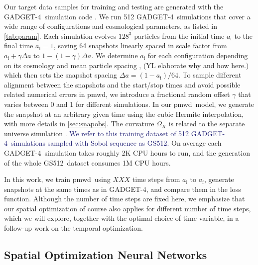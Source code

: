 \documentclass[modern, trackchanges, dvipsnames]{aastex631}
\newcommand{\pmwd}{{\usefont{T1}{nova}{m}{sl}pmwd}}
\newcommand{\GADGET}{{{\fontsize{10pt}{12pt}\selectfont GADGET}-4}}
\newcommand{\GSDATA}{{GS512}}
\newcommand{\OmegaK}{\Omega_K}
\newcommand{\ic}{\mathrm{i}}
\newcommand{\f}{\mathrm{f}}
\newcommand{\YL}[1]{\textcolor{Bittersweet}{#1}}
\newcommand{\YZ}[1]{\textcolor{MidnightBlue}{#1}}
\begin{document}
Our target data samples for training and testing are generated with the
\GADGET\ simulation code \citep{GADGET-4}.
We run 512 \GADGET\ simulations that cover a wide range of
configurations and cosmological parameters, as listed in
\autoref{tab:param}.
\YL{
Each simulation evolves $128^3$ particles from the initial time $a_\ic$
to the final time $a_\f=1$, saving 64 snapshots linearly spaced in scale
factor from $a_\ic + \gamma \Delta a$ to $1 - (1 - \gamma) \Delta a$.
We determine $a_\ic$ for each configuration depending on its cosmology
and mean particle spacing \citep{MichauxEtAl2021}, \YL{(YL elaborate why and how here.)} which then sets the
snapshot spacing $\Delta a = (1 - a_\ic) / 64$.
To sample different alignment between the snapshots and the start/stop
times and avoid possible related numerical errors in \pmwd, we introduce
a fractional random offset $\gamma$ that varies between 0 and 1 for
different simulations.
}
In our \pmwd\ model, we generate the snapshot at an arbitrary given time
using the cubic Hermite interpolation, with more details in
\autoref{sec:snapobs}.
The curvature $\OmegaK$ is related to the separate universe simulation
\citep{LiEtAl2014, WagnerEtAl2015}.
\YZ{We refer to this training dataset of 512 \GADGET\ simulations sampled with
Sobol sequence as \GSDATA.}
On average each \GADGET\ simulation takes roughly 2K CPU hours to run, and the
generation of the whole \GSDATA\ dataset consumes 1M CPU hours.

\YL{
In this work, we train \pmwd\ using $XXX$ time steps from $a_\ic$ to
$a_\f$, generate snapshots at the same times as in \GADGET, and compare
them in the loss function.
Although the number of time steps are fixed here, we emphasize that our
spatial optimization of course also applies for different number of time
steps, which we will explore, together with the optimal choice of time
variable, in a follow-up work on the temporal optimization.
}


\subsection{Spatial Optimization Neural Networks}
\end{document}
